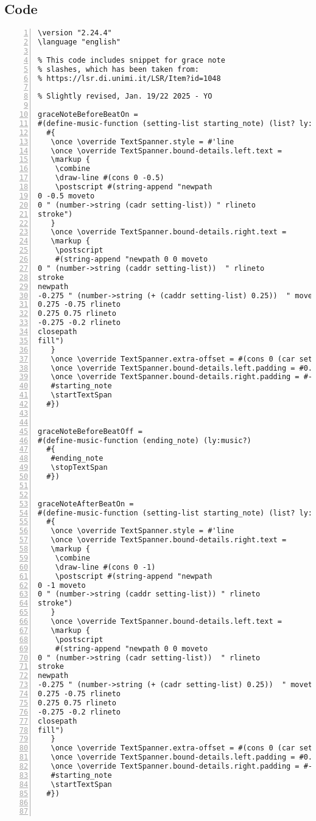 \subsection{Code}
\begin{Verbatim}[numbers=left,xleftmargin=5mm]
\version "2.24.4"
\language "english"

% This code includes snippet for grace note
% slashes, which has been taken from:
% https://lsr.di.unimi.it/LSR/Item?id=1048

% Slightly revised, Jan. 19/22 2025 - YO

graceNoteBeforeBeatOn =
#(define-music-function (setting-list starting_note) (list? ly:music? )
  #{
   \once \override TextSpanner.style = #'line
   \once \override TextSpanner.bound-details.left.text =
   \markup {
    \combine
    \draw-line #(cons 0 -0.5)
    \postscript #(string-append "newpath 
0 -0.5 moveto 
0 " (number->string (cadr setting-list)) " rlineto 
stroke")
   }
   \once \override TextSpanner.bound-details.right.text =
   \markup {
    \postscript
    #(string-append "newpath 0 0 moveto 
0 " (number->string (caddr setting-list))  " rlineto 
stroke 
newpath 
-0.275 " (number->string (+ (caddr setting-list) 0.25))  " moveto 
0.275 -0.75 rlineto 
0.275 0.75 rlineto 
-0.275 -0.2 rlineto 
closepath 
fill")
   }
   \once \override TextSpanner.extra-offset = #(cons 0 (car setting-list))
   \once \override TextSpanner.bound-details.left.padding = #0.5
   \once \override TextSpanner.bound-details.right.padding = #-0.25
   #starting_note
   \startTextSpan
  #})


graceNoteBeforeBeatOff =
#(define-music-function (ending_note) (ly:music?)
  #{
   #ending_note
   \stopTextSpan
  #})


graceNoteAfterBeatOn =
#(define-music-function (setting-list starting_note) (list? ly:music?)
  #{
   \once \override TextSpanner.style = #'line
   \once \override TextSpanner.bound-details.right.text =
   \markup {
    \combine
    \draw-line #(cons 0 -1)
    \postscript #(string-append "newpath 
0 -1 moveto 
0 " (number->string (caddr setting-list)) " rlineto 
stroke")
   }
   \once \override TextSpanner.bound-details.left.text =
   \markup {
    \postscript
    #(string-append "newpath 0 0 moveto 
0 " (number->string (cadr setting-list))  " rlineto 
stroke 
newpath 
-0.275 " (number->string (+ (cadr setting-list) 0.25))  " moveto 
0.275 -0.75 rlineto 
0.275 0.75 rlineto 
-0.275 -0.2 rlineto 
closepath 
fill")
   }
   \once \override TextSpanner.extra-offset = #(cons 0 (car setting-list))
   \once \override TextSpanner.bound-details.left.padding = #0.5
   \once \override TextSpanner.bound-details.right.padding = #-0.25
   #starting_note
   \startTextSpan
  #})



\end{Verbatim}
